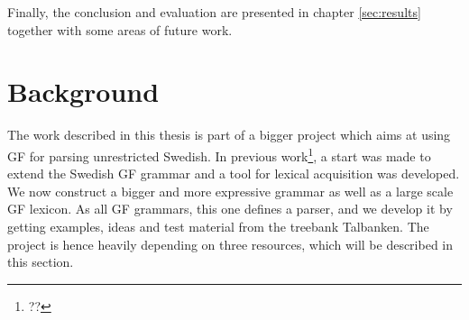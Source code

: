 \documentclass{report}
\begin{document}
Finally, the conclusion and evaluation are
presented in chapter \ref{sec:results} together with some areas of future work.






\chapter{Background}  
\label{sec:background}
The work described in this thesis is part of a bigger project which aims at
using GF for parsing unrestricted Swedish. 
In previous work\footnote{??}, a start was made to extend the Swedish GF grammar
and a tool for lexical acquisition was developed.
We now construct a bigger
and more expressive grammar as well as a large scale GF lexicon.
As all GF grammars, this one defines a parser, and we develop it by getting
examples, ideas and test material from the treebank Talbanken.
The project is hence heavily depending on three resources, which will be described
in this section.
\end{document}
